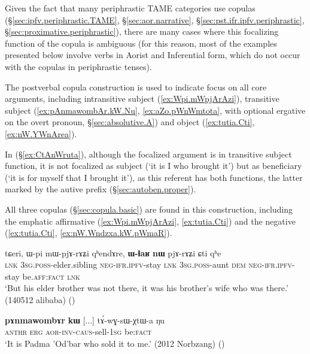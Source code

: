 Given the fact that many periphrastic TAME categories use copulas (§\ref{sec:ipfv.periphrastic.TAME}, §\ref{sec:aor.narrative}, §\ref{sec:pst.ifr.ipfv.periphrastic}, §\ref{sec:proximative.periphrastic}), there are many cases where this focalizing function of the copula is ambiguous (for this reason, most of the examples presented below involve verbs in Aorist and Inferential form, which do not occur with the copulas in periphrastic tenses). 


The postverbal copula construction is used to indicate focus on all core arguments, including intransitive subject (\ref{ex:Wpi.mWpjArAzi}), transitive subject (\ref{ex:pAnmawombAr.kW.Nu}, \ref{ex:aZo.pWnWmtota}, with optional ergative on the overt pronoun, §\ref{sec:absolutive.A}) and object (\ref{ex:tutia.Cti}, \ref{ex:nW.YWnArea}). 

In (§\ref{ex:CtAnWruta}), although the focalized argument is in transitive subject function, it is not focalized as subject (`it is I who brought it') but as beneficiary (`it is for myself that I brought it'), as this referent has both functions, the latter marked by the autive prefix  (§\ref{sec:autoben.proper}).

All three copulas (§\ref{sec:copula.basic}) are found in this construction, including the emphatic affirmative  (\ref{ex:Wpi.mWpjArAzi}, \ref{ex:tutia.Cti}) and the negative  (\ref{ex:tutia.Cti}, \ref{ex:nW.Wndzxa.kW.pWmaR}).

\begin{exe}
\ex \label{ex:Wpi.mWpjArAzi}
\gll tɕeri, ɯ-pi mɯ-pjɤ-rɤʑi qʰendɤre,  \textbf{ɯ-ɬaʁ} \textbf{nɯ} pjɤ-rɤʑi ɕti qʰe  \\
\textsc{lnk} \textsc{3sg}.\textsc{poss}-elder.sibling \textsc{neg}-\textsc{ifr}.\textsc{ipfv}-stay \textsc{lnk} \textsc{3sg}.\textsc{poss}-aunt \textsc{dem} \textsc{neg}-\textsc{ifr}.\textsc{ipfv}-stay be.\textsc{aff}:\textsc{fact} \textsc{lnk} \\
\glt  `But his elder brother was not there, it was his brother's wife who was there.' (140512 alibaba)
()
\end{exe}

\begin{exe}
\ex \label{ex:pAnmawombAr.kW.Nu}
\gll  \textbf{pɤnmawombɤr} \textbf{kɯ} [...] tɤ́-wɣ-sɯ-χtɯ-a ŋu \\
\textsc{anthr} \textsc{erg} { } \textsc{aor}-\textsc{inv}-\textsc{caus}-sell-\textsc{1sg} be:\textsc{fact} \\
\glt `It is Padma 'Od'bar who sold it to me.' (2012 Norbzang)
()
\end{exe} 

